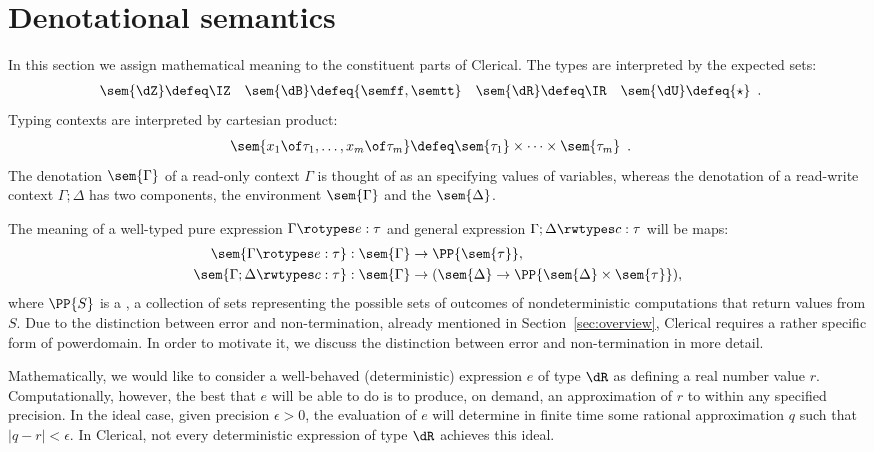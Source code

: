 \section{Denotational semantics}
\label{sec:denotation}

In this section we assign mathematical meaning to the constituent parts of Clerical.
%
The types are interpreted by  the expected sets:
%
\begin{align*}
\sem{\dZ} &\defeq \IZ &
\sem{\dB} &\defeq \{\semff, \semtt\} &
\sem{\dR} &\defeq \IR &
\sem{\dU} &\defeq \{\star\} \enspace .
\end{align*}
%
Typing contexts are interpreted by cartesian product:
%
\begin{align*}
  \sem{x_1 \of \tau_1, \ldots, x_m \of \tau_m} &\defeq
  \sem{\tau_1} \times \cdots \times \sem{\tau_m} \enspace .
\end{align*}
%
The denotation $\sem{\Gamma}$ of a read-only context $\Gamma$ is thought of as an  specifying values of variables, whereas the denotation of a read-write context $\Gamma ; \Delta$ has two components, the environment $\sem{\Gamma}$ and the  $\sem{\Delta}$.

The meaning of a well-typed pure expression $\Gamma \rotypes e : \tau$ and
general expression $\Gamma; \Delta \rwtypes c : \tau$ 
 will be maps:
%
\begin{align*}
  \sem{\Gamma  \rotypes e : \tau}  & : \sem{\Gamma} \to \PP{\sem{\tau}}, \\
  \sem{\Gamma; \Delta \rwtypes c : \tau}  & : \sem{\Gamma} \to (\sem{\Delta} \to \PP{\sem{\Delta} \times \sem{\tau}}),
\end{align*}
%
where $\PP{S}$ is  a , a collection of sets representing the possible sets of outcomes of nondeterministic computations that return values from $S$. Due to the distinction between error and non-termination, already mentioned in Section~\ref{sec:overview}, 
Clerical requires a rather specific form of powerdomain. In order to motivate it, we discuss the distinction between
error and non-termination in more detail.

Mathematically, we would like to  consider a well-behaved (deterministic) expression $e$ of type $\dR$ as defining a real number value $r$. Computationally, however, the best that $e$ will be able to do is to produce, on demand, an approximation of $r$ to within any specified precision. In the ideal case, given precision $\epsilon > 0$, the evaluation of $e$ will determine in finite time some rational approximation $q$ such that $|q - r| < \epsilon$. In Clerical, not every  deterministic expression of type $\dR$ achieves this ideal.

